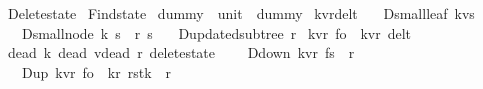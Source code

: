%
\begin{isabellebody}%
%
%
\isadelimtheory
%
\endisadelimtheory
%
\isatagtheory
{}\isamarkupfalse%
\ Delete{\isacharunderscore}state\isanewline
{}\ Find{\isacharunderscore}state\isanewline
{}%
\endisatagtheory
{\isafoldtheory}%
%
\isadelimtheory
\isanewline
%
\endisadelimtheory
\isanewline
\isanewline
\isanewline
{}\isamarkupfalse%
\ dummy\ {\isacharcolon}{\isacharcolon}\ {\isachardoublequoteopen}unit{\isachardoublequoteclose}\ \ {\isachardoublequoteopen}dummy{\isacharequal}{\isacharparenleft}{\isacharparenright}{\isachardoublequoteclose}\isanewline
\isanewline
\isanewline
\isanewline
{}\isamarkupfalse%
\ {\isacharparenleft}{\isacharprime}k{\isacharcomma}{\isacharprime}v{\isacharcomma}{\isacharprime}r{\isacharparenright}del{\isacharunderscore}t\ {\isacharequal}\isanewline
\ \ D{\isacharunderscore}small{\isacharunderscore}leaf\ {\isachardoublequoteopen}{\isacharparenleft}{\isacharprime}k{\isacharasterisk}{\isacharprime}v{\isacharparenright}s{\isachardoublequoteclose}\isanewline
\ \ {\isacharbar}\ D{\isacharunderscore}small{\isacharunderscore}node\ {\isachardoublequoteopen}{\isacharprime}k\ s\ {\isacharasterisk}\ {\isacharprime}r\ s{\isachardoublequoteclose}\isanewline
\ \ {\isacharbar}\ D{\isacharunderscore}updated{\isacharunderscore}subtree\ {\isachardoublequoteopen}{\isacharprime}r{\isachardoublequoteclose}\isanewline
\isanewline
{}\isamarkupfalse%
\ {\isacharparenleft}{\isacharprime}k{\isacharcomma}{\isacharprime}v{\isacharcomma}{\isacharprime}r{\isacharparenright}\ fo\ {\isacharequal}\ {\isachardoublequoteopen}{\isacharparenleft}{\isacharprime}k{\isacharcomma}{\isacharprime}v{\isacharcomma}{\isacharprime}r{\isacharparenright}\ del{\isacharunderscore}t{\isachardoublequoteclose}\ \ \isanewline
\isanewline
\isanewline
\isanewline
\isanewline
{}\isamarkupfalse%
\ {\isacharparenleft}dead\ {\isacharprime}k{\isacharcomma}\ dead\ {\isacharprime}v{\isacharcomma}dead\ {\isacharprime}r{\isacharparenright}\ delete{\isacharunderscore}state\ {\isacharequal}\ \isanewline
\ \ D{\isacharunderscore}down\ {\isachardoublequoteopen}{\isacharparenleft}{\isacharprime}k{\isacharcomma}{\isacharprime}v{\isacharcomma}{\isacharprime}r{\isacharparenright}\ fs\ {\isacharasterisk}\ {\isacharprime}r{\isachardoublequoteclose}\ \ \isanewline
\ \ {\isacharbar}\ D{\isacharunderscore}up\ {\isachardoublequoteopen}{\isacharparenleft}{\isacharprime}k{\isacharcomma}{\isacharprime}v{\isacharcomma}{\isacharprime}r{\isacharparenright}\ fo\ {\isacharasterisk}\ {\isacharparenleft}{\isacharprime}k{\isacharcomma}{\isacharprime}r{\isacharparenright}\ rstk\ {\isacharasterisk}\ {\isacharprime}r{\isachardoublequoteclose}\ \ \isanewline

\end{isabellebody}
